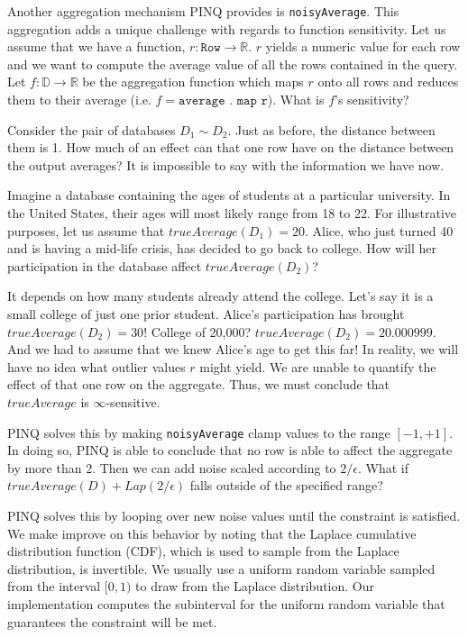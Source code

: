 \documentclass[12pt]{article}
\begin{document}
Another aggregation mechanism PINQ provides is \texttt{noisyAverage}.
This aggregation adds a unique challenge with regards to function sensitivity.
Let us assume that we have a function, $r : \texttt{Row} \rightarrow \mathbb R$.
$r$ yields a numeric value for each row and we want to compute the average value of all the rows contained in the query.
Let $f : \mathbb D \rightarrow \mathbb R$ be the aggregation function which maps $r$ onto all rows and reduces them to their average (i.e. $f = \texttt{average . map r}$).
What is $f$'s sensitivity?

Consider the pair of databases $D_1 \sim D_2$.
Just as before, the distance between them is 1.
How much of an effect can that one row have on the distance between the output averages?
It is impossible to say with the information we have now.

Imagine a database containing the ages of students at a particular university.
In the United States, their ages will most likely range from 18 to 22.
For illustrative purposes, let us assume that $trueAverage(D_1) = 20$.
Alice, who just turned 40 and is having a mid-life crisis, has decided to go back to college.
How will her participation in the database affect $trueAverage(D_2)$?

It depends on how many students already attend the college.
Let's say it is a small college of just one prior student.
Alice's participation has brought $trueAverage(D_2) = 30$!
College of 20,000?
$trueAverage(D_2) = 20.000999$.
And we had to assume that we knew Alice's age to get this far!
In reality, we will have no idea what outlier values $r$ might yield.
We are unable to quantify the effect of that one row on the aggregate.
Thus, we must conclude that $trueAverage$ is $\infty$-sensitive.

PINQ solves this by making \texttt{noisyAverage} clamp values to the range $[-1,+1]$.
In doing so, PINQ is able to conclude that no row is able to affect the aggregate by more than 2.
Then we can add noise scaled according to $2/\epsilon$.
What if $trueAverage(D) + Lap(2/\epsilon)$ falls outside of the specified range?

PINQ solves this by looping over new noise values until the constraint is satisfied.
We make improve on this behavior by noting that the Laplace cumulative distribution function (CDF), which is used to sample from the Laplace distribution, is invertible.
We usually use a uniform random variable sampled from the interval $[0,1)$ to draw from the Laplace distribution.
Our implementation computes the subinterval for the uniform random variable that guarantees the constraint will be met.
\end{document}
